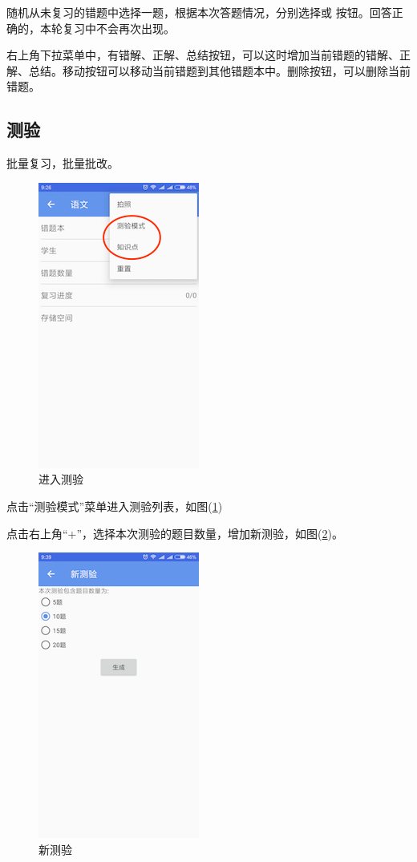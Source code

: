 随机从未复习的错题中选择一题，根据本次答题情况，分别选择\Checkmark 或 \XSolid 按钮。回答正确的，本轮复习中不会再次出现。

右上角下拉菜单中，有错解、正解、总结按钮，可以这时增加当前错题的错解、正解、总结。移动按钮可以移动当前错题到其他错题本中。删除按钮，可以删除当前错题。

\subsection{测验}
批量复习，批量批改。
\begin{figure}[H]
	\centering
	\includegraphics{img/32.png}
	\caption{进入测验}
	\label{img32}
\end{figure}
点击“测验模式”菜单进入测验列表，如图(\ref{img32})

点击右上角“+”，选择本次测验的题目数量，增加新测验，如图(\ref{img33})。
\begin{figure}[H]
	\centering
	\includegraphics{img/33.png}
	\caption{新测验}
	\label{img33}
\end{figure}

